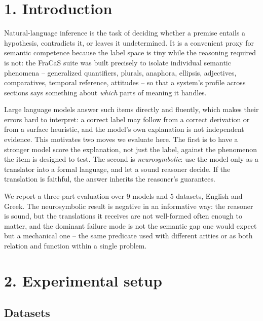 \documentclass[11pt]{article}
\begin{document}
\section{1. Introduction}

Natural-language inference is the task of deciding whether a premise
entails a hypothesis, contradicts it, or leaves it undetermined. It is a
convenient proxy for semantic competence because the label space is tiny
while the reasoning required is not: the FraCaS suite was built precisely
to isolate individual semantic phenomena -- generalized quantifiers,
plurals, anaphora, ellipsis, adjectives, comparatives, temporal
reference, attitudes -- so that a system's profile across sections says
something about \emph{which} parts of meaning it handles.

Large language models answer such items directly and fluently, which
makes their errors hard to interpret: a correct label may follow from a
correct derivation or from a surface heuristic, and the model's own
explanation is not independent evidence. This motivates two moves we
evaluate here. The first is to have a stronger model score the
explanation, not just the label, against the phenomenon the item is
designed to test. The second is \emph{neurosymbolic}: use the model only as a
translator into a formal language, and let a sound reasoner decide. If
the translation is faithful, the answer inherits the reasoner's
guarantees.

We report a three-part evaluation over 9 models and
5 datasets, English and Greek. The neurosymbolic result is
negative in an informative way: the reasoner is sound, but the
translations it receives are not well-formed often enough to matter, and
the dominant failure mode is not the semantic gap one would expect but a
mechanical one -- the same predicate used with different arities or as
both relation and function within a single problem.

\section{2. Experimental setup}

\subsection{Datasets}
\end{document}
